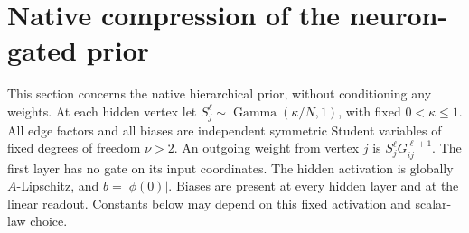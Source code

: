 \section{Native compression of the neuron-gated prior}
\label{sec:ard-native-compression}
This section concerns the native hierarchical prior, without conditioning any weights. At each hidden vertex let $S_j^\ell\sim\operatorname{Gamma}(\kappa/N,1)$, with fixed $0<\kappa\le1$. All edge factors and all biases are independent symmetric Student variables of fixed degrees of freedom $\nu>2$. An outgoing weight from vertex $j$ is $S_j^\ell G_{ij}^{\ell+1}$. The first layer has no gate on its input coordinates. The hidden activation is globally $A$-Lipschitz, and $b=|\phi(0)|$. Biases are present at every hidden layer and at the linear readout. Constants below may depend on this fixed activation and scalar-law choice.

